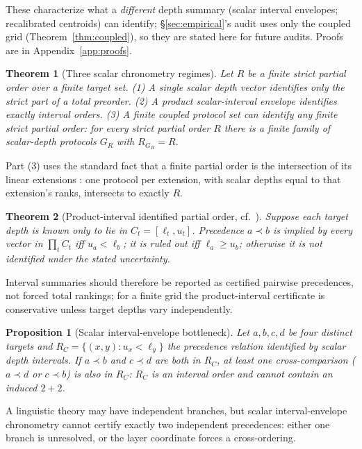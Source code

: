 \documentclass[11pt]{article}
\newtheorem{theorem}{Theorem}
\newtheorem{proposition}{Proposition}
\begin{document}
These characterize what a \emph{different} depth summary (scalar interval envelopes; recalibrated centroids) can identify; \S\ref{sec:empirical}'s audit uses only the coupled grid (Theorem~\ref{thm:coupled}), so they are stated here for future audits. Proofs are in Appendix~\ref{app:proofs}.

\begin{theorem}[Three scalar chronometry regimes]
\label{thm:regimes}
Let $R$ be a finite strict partial order over a finite target set. (1) A single scalar depth vector identifies only the strict part of a total preorder. (2) A product scalar-interval envelope identifies exactly interval orders. (3) A finite coupled protocol set can identify \emph{any} finite strict partial order: for every strict partial order $R$ there is a finite family of scalar-depth protocols $G_R$ with $R_{G_R}=R$.
\end{theorem}

Part (3) uses the standard fact that a finite partial order is the intersection of its linear extensions \citep{szpilrajn1930extension,dushnikmiller1941partial}: one protocol per extension, with scalar depths equal to that extension's ranks, intersects to exactly $R$.

\begin{theorem}[Product-interval identified partial order, cf.\ \citealp{fishburn1985interval}]
\label{thm:interval}
Suppose each target depth is known only to lie in $C_t=[\ell_t,u_t]$. Precedence $a\prec b$ is implied by every vector in $\prod_t C_t$ iff $u_a<\ell_b$; it is ruled out iff $\ell_a\ge u_b$; otherwise it is not identified under the stated uncertainty.
\end{theorem}

Interval summaries should therefore be reported as certified pairwise precedences, not forced total rankings; for a finite grid the product-interval certificate is conservative unless target depths vary independently.

\begin{proposition}[Scalar interval-envelope bottleneck]
\label{prop:bottleneck}
Let $a,b,c,d$ be four distinct targets and $R_C=\{(x,y):u_x<\ell_y\}$ the precedence relation identified by scalar depth intervals. If $a\prec b$ and $c\prec d$ are both in $R_C$, at least one cross-comparison ($a\prec d$ or $c\prec b$) is also in $R_C$: $R_C$ is an interval order and cannot contain an induced $2+2$.
\end{proposition}

A linguistic theory may have independent branches, but scalar interval-envelope chronometry cannot certify exactly two independent precedences: either one branch is unresolved, or the layer coordinate forces a cross-ordering.
\end{document}
